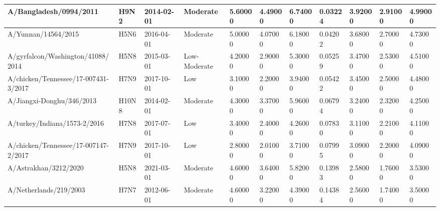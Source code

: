 \begin{tabular}{L{1in}|L{1in}|L{1in}|L{1in}|L{1in}|L{1in}|L{1in}|L{1in}|L{1in}|L{1in}|L{1in}}
 A/Bangladesh/0994/2011 &H9N2&2014-02-01& Moderate &5.60000&4.49000&6.74000&0.03224&3.92000&2.91000&4.99000\\\hline
 A/Yunnan/14564/2015 &H5N6&2016-04-01& Moderate &5.00000&4.07000&6.18000&0.04202&3.68000&2.70000&4.73000\\\hline
 A/gyrfalcon/Washington/41088/2014 &H5N8&2015-03-01& Low-Moderate &4.20000&2.90000&5.30000&0.05259&3.47000&2.53000&4.51000\\\hline
 A/chicken/Tennessee/17-007431-3/2017 &H7N9&2017-10-01&Low&3.10000&2.20000&3.94000&0.05422&3.45000&2.50000&4.48000\\\hline
 A/Jiangxi-Donghu/346/2013 &H10N8&2014-02-01& Moderate &4.30000&3.37000&5.96000&0.06794&3.24000&2.32000&4.25000\\\hline
 A/turkey/Indiana/1573-2/2016 &H7N8&2017-07-01&Low&3.40000&2.40000&4.26000&0.07830&3.11000&2.21000&4.11000\\\hline
 A/chicken/Tennessee/17-007147-2/2017 &H7N9&2017-10-01&Low&2.80000&2.01000&3.71000&0.07995&3.09000&2.20000&4.09000\\\hline
 A/Astrakhan/3212/2020 &H5N8&2021-03-01& Moderate &4.60000&3.64000&5.82000&0.13983&2.58000&1.76000&3.53000\\\hline
 A/Netherlands/219/2003 &H7N7&2012-06-01& Moderate &4.60000&3.22000&4.39000&0.14384&2.56000&1.74000&3.50000\\\hline
\hline\end{tabular}
